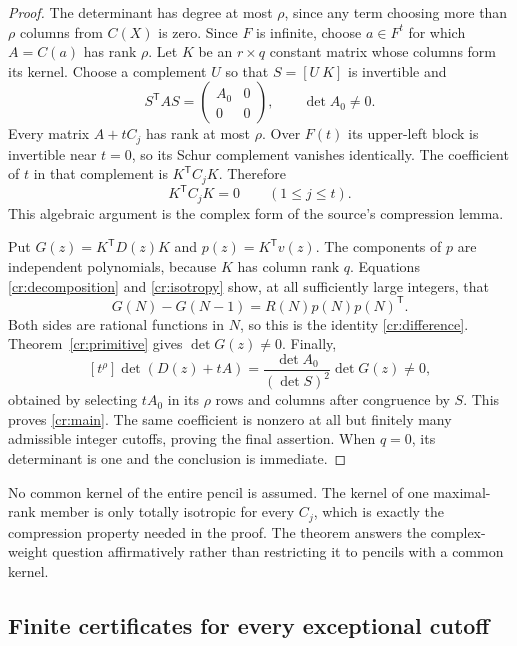 \documentclass[11pt,a4paper]{article}
\theoremstyle{definition}
\theoremstyle{remark}
\numberwithin{equation}{section}
\begin{document}
\begin{proof}
The determinant has degree at most $\rho$, since any term choosing
more than $\rho$ columns from $C(X)$ is zero.  Since $F$ is infinite,
choose $a\in F^t$ for which $A=C(a)$ has rank $\rho$.  Let $K$
be an $r\times q$ constant matrix whose columns form its kernel.
Choose a complement $U$ so that $S=[U\ K]$ is invertible and
\[
 S^{\mathsf T}AS=\begin{pmatrix}A_0&0\\0&0\end{pmatrix},
 \qquad\det A_0\ne0.
\]
Every matrix $A+tC_j$ has rank at most $\rho$.  Over $F(t)$
its upper-left block is invertible near $t=0$, so its Schur complement
vanishes identically.  The coefficient of $t$ in that complement is
$K^{\mathsf T}C_jK$.  Therefore
\begin{equation}\label{cr:isotropy}
 K^{\mathsf T}C_jK=0\qquad(1\le j\le t).
\end{equation}
This algebraic argument is the complex form of the source's
compression lemma.

Put $G(z)=K^{\mathsf T}D(z)K$ and $p(z)=K^{\mathsf T}v(z)$.
The components of $p$ are independent polynomials, because $K$
has column rank $q$.  Equations \eqref{cr:decomposition} and
\eqref{cr:isotropy} show, at all sufficiently large integers, that
\[
 G(N)-G(N-1)=R(N)p(N)p(N)^{\mathsf T}.
\]
Both sides are rational functions in $N$, so this is the identity
\eqref{cr:difference}.  Theorem~\ref{cr:primitive} gives
$\det G(z)\ne0$.  Finally,
\begin{equation}\label{cr:direction}
 [t^\rho]\det(D(z)+tA)
   =\frac{\det A_0}{(\det S)^2}\det G(z)\ne0,
\end{equation}
obtained by selecting $tA_0$ in its $\rho$ rows and columns after
congruence by $S$.  This proves \eqref{cr:main}.  The same
coefficient is nonzero at all but finitely many admissible integer
cutoffs, proving the final assertion.  When $q=0$, its determinant
is one and the conclusion is immediate.
\end{proof}

No common kernel of the entire pencil is assumed.  The kernel of
one maximal-rank member is only totally isotropic for every $C_j$,
which is exactly the compression property needed in the proof.
The theorem answers the complex-weight question affirmatively rather
than restricting it to pencils with a common kernel.

\subsection{Finite certificates for every exceptional cutoff}
\end{document}
